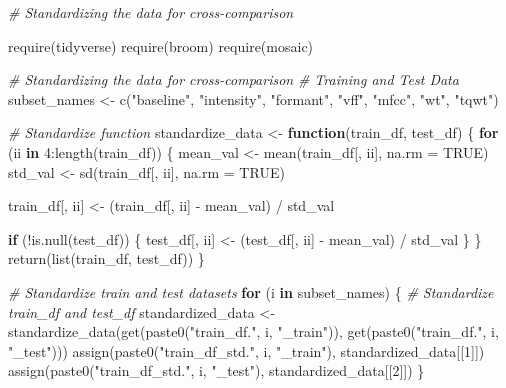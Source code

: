 \documentclass[
]{article}
\newenvironment{Shaded}{\begin{snugshade}}{\end{snugshade}}
\newcommand{\AttributeTok}[1]{\textcolor[rgb]{0.77,0.63,0.00}{#1}}
\newcommand{\CommentTok}[1]{\textcolor[rgb]{0.56,0.35,0.01}{\textit{#1}}}
\newcommand{\ConstantTok}[1]{\textcolor[rgb]{0.00,0.00,0.00}{#1}}
\newcommand{\ControlFlowTok}[1]{\textcolor[rgb]{0.13,0.29,0.53}{\textbf{#1}}}
\newcommand{\DecValTok}[1]{\textcolor[rgb]{0.00,0.00,0.81}{#1}}
\newcommand{\FunctionTok}[1]{\textcolor[rgb]{0.00,0.00,0.00}{#1}}
\newcommand{\NormalTok}[1]{#1}
\newcommand{\OtherTok}[1]{\textcolor[rgb]{0.56,0.35,0.01}{#1}}
\newcommand{\SpecialCharTok}[1]{\textcolor[rgb]{0.00,0.00,0.00}{#1}}
\newcommand{\StringTok}[1]{\textcolor[rgb]{0.31,0.60,0.02}{#1}}
\begin{document}
\begin{Shaded}
\begin{Highlighting}[]
\CommentTok{\# Standardizing the data for cross{-}comparison}

\FunctionTok{require}\NormalTok{(tidyverse)}
\FunctionTok{require}\NormalTok{(broom)}
\FunctionTok{require}\NormalTok{(mosaic)}

\CommentTok{\# Standardizing the data for cross{-}comparison}
\CommentTok{\# Training and Test Data}
\NormalTok{subset\_names }\OtherTok{\textless{}{-}} \FunctionTok{c}\NormalTok{(}\StringTok{"baseline"}\NormalTok{, }\StringTok{"intensity"}\NormalTok{, }\StringTok{"formant"}\NormalTok{, }\StringTok{"vff"}\NormalTok{, }\StringTok{"mfcc"}\NormalTok{, }\StringTok{"wt"}\NormalTok{, }\StringTok{"tqwt"}\NormalTok{)}

\CommentTok{\# Standardize function}
\NormalTok{standardize\_data }\OtherTok{\textless{}{-}} \ControlFlowTok{function}\NormalTok{(train\_df, test\_df) \{}
  \ControlFlowTok{for}\NormalTok{ (ii }\ControlFlowTok{in} \DecValTok{4}\SpecialCharTok{:}\FunctionTok{length}\NormalTok{(train\_df)) \{}
\NormalTok{    mean\_val }\OtherTok{\textless{}{-}} \FunctionTok{mean}\NormalTok{(train\_df[, ii], }\AttributeTok{na.rm =} \ConstantTok{TRUE}\NormalTok{)}
\NormalTok{    std\_val }\OtherTok{\textless{}{-}} \FunctionTok{sd}\NormalTok{(train\_df[, ii], }\AttributeTok{na.rm =} \ConstantTok{TRUE}\NormalTok{)}
    
\NormalTok{    train\_df[, ii] }\OtherTok{\textless{}{-}}\NormalTok{ (train\_df[, ii] }\SpecialCharTok{{-}}\NormalTok{ mean\_val) }\SpecialCharTok{/}\NormalTok{ std\_val}
    
    \ControlFlowTok{if}\NormalTok{ (}\SpecialCharTok{!}\FunctionTok{is.null}\NormalTok{(test\_df)) \{}
\NormalTok{      test\_df[, ii] }\OtherTok{\textless{}{-}}\NormalTok{ (test\_df[, ii] }\SpecialCharTok{{-}}\NormalTok{ mean\_val) }\SpecialCharTok{/}\NormalTok{ std\_val}
\NormalTok{    \}}
\NormalTok{  \}}
  \FunctionTok{return}\NormalTok{(}\FunctionTok{list}\NormalTok{(train\_df, test\_df))}
\NormalTok{\}}

\CommentTok{\# Standardize train and test datasets}
\ControlFlowTok{for}\NormalTok{ (i }\ControlFlowTok{in}\NormalTok{ subset\_names) \{}
  \CommentTok{\# Standardize train\_df and test\_df}
\NormalTok{  standardized\_data }\OtherTok{\textless{}{-}} \FunctionTok{standardize\_data}\NormalTok{(}\FunctionTok{get}\NormalTok{(}\FunctionTok{paste0}\NormalTok{(}\StringTok{"train\_df."}\NormalTok{, i, }\StringTok{"\_train"}\NormalTok{)), }\FunctionTok{get}\NormalTok{(}\FunctionTok{paste0}\NormalTok{(}\StringTok{"train\_df."}\NormalTok{, i, }\StringTok{"\_test"}\NormalTok{)))}
  \FunctionTok{assign}\NormalTok{(}\FunctionTok{paste0}\NormalTok{(}\StringTok{"train\_df\_std."}\NormalTok{, i, }\StringTok{"\_train"}\NormalTok{), standardized\_data[[}\DecValTok{1}\NormalTok{]])}
  \FunctionTok{assign}\NormalTok{(}\FunctionTok{paste0}\NormalTok{(}\StringTok{"train\_df\_std."}\NormalTok{, i, }\StringTok{"\_test"}\NormalTok{), standardized\_data[[}\DecValTok{2}\NormalTok{]])}
\NormalTok{\}}


\end{Highlighting}
\end{Shaded}
\end{document}
